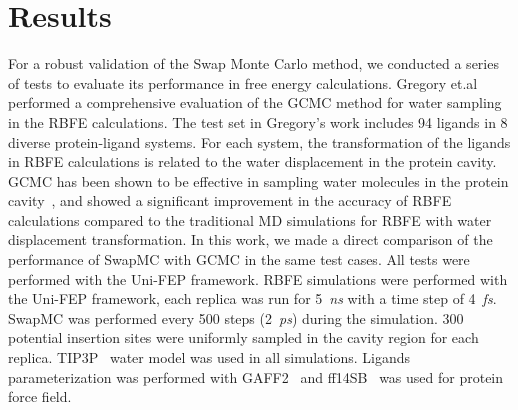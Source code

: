 \documentclass[journal=jacsat,manuscript=article]{achemso}
\begin{document}
\section{Results}
For a robust validation of the Swap Monte Carlo method, 
we conducted a series of tests to evaluate its performance in free energy calculations.
Gregory et.al~\cite{ross2020enhancing} performed a comprehensive evaluation of the GCMC method for water sampling in the RBFE calculations.
The test set in Gregory's work includes 94 ligands in 8 diverse protein-ligand systems.
For each system, the transformation of the ligands in RBFE calculations is related to the water displacement in the protein cavity.
GCMC has been shown to be effective in sampling water molecules in the protein cavity~\cite{ross2015water},
and showed a significant improvement in the accuracy of RBFE calculations compared to the traditional MD simulations for RBFE with water displacement transformation.
In this work, we made a direct comparison of the performance of SwapMC with GCMC in the same test cases.
All tests were performed with the Uni-FEP framework.
RBFE simulations were performed with the Uni-FEP framework, 
each replica was run for 5~\textit{ns} with a time step of 4~\textit{fs}.
SwapMC was performed every 500 steps (2~\textit{ps}) during the simulation.
300 potential insertion sites were uniformly sampled in the cavity region for each replica.
TIP3P~\cite{Jorgensen1983} water model was used in all simulations.
Ligands parameterization was performed with GAFF2~\cite{he2020fast} and ff14SB~\cite{Maier2015} was used for protein force field.
\end{document}
